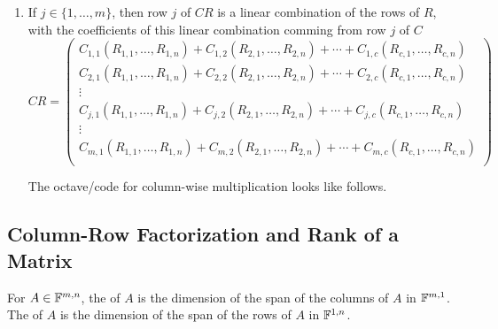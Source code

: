 \begin{thm}
\begin{enumerate}
    \item If $j\in \{1, \ldots, m\}$, then row $j$ of $CR$ is a linear combination of the rows of $R$, with the coefficients of this linear combination comming from row $j$ of $C$
    \begin{equation}
      CR = 
      \left(
        \begin{matrix}
          C_{1,1} (R_{1,1}, \ldots, R_{1,n}) + C_{1,2} (R_{2,1}, \ldots, R_{2,n}) + \cdots + C_{1,c} (R_{c,1}, \ldots, R_{c,n}) \\
          C_{2,1} (R_{1,1}, \ldots, R_{1,n}) + C_{2,2} (R_{2,1}, \ldots, R_{2,n}) + \cdots + C_{2,c} (R_{c,1}, \ldots, R_{c,n}) \\
          \vdots \\
          C_{j,1} (R_{1,1}, \ldots, R_{1,n}) + C_{j,2} (R_{2,1}, \ldots, R_{2,n}) + \cdots + C_{j,c} (R_{c,1}, \ldots, R_{c,n}) \\
          \vdots \\
          C_{m,1} (R_{1,1}, \ldots, R_{1,n}) + C_{m,2} (R_{2,1}, \ldots, R_{2,n}) + \cdots + C_{m,c} (R_{c,1}, \ldots, R_{c,n}) \\
        \end{matrix}
      \right)
    \end{equation}
    

    The octave\-/code for column-wise multiplication looks like follows.
    
    \begin{center}
      \begin{minipage}{\linewidth}
        \addtolength{\linewidth}{-7em} 
        
        \addtolength{\linewidth}{+7em}
      \end{minipage}
    \end{center}
  \end{enumerate}
\end{thm}

\subsection{Column-Row Factorization and Rank of a Matrix}

\setcounter{thm}{51}
\begin{mydef}
  For $A \in \mathbb{F}^{m,n}$, the  of $A$ is the dimension of the span of the columns of $A$ in $\mathbb{F}^{m,1}$. The  of $A$ is the dimension of the span of the rows of $A$ in $\mathbb{F}^{1,n}$.
\end{mydef}

